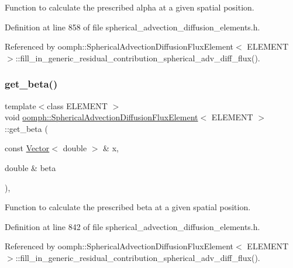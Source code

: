 Function to calculate the prescribed alpha at a given spatial position. 



Definition at line 858 of file spherical\+\_\+advection\+\_\+diffusion\+\_\+elements.\+h.



Referenced by oomph\+::\+Spherical\+Advection\+Diffusion\+Flux\+Element$<$ E\+L\+E\+M\+E\+N\+T $>$\+::fill\+\_\+in\+\_\+generic\+\_\+residual\+\_\+contribution\+\_\+spherical\+\_\+adv\+\_\+diff\+\_\+flux().

\mbox{\label{classoomph_1_1SphericalAdvectionDiffusionFluxElement_a7ba9d40e23873038895ec070b9bc29ad}} 
\subsubsection{\texorpdfstring{get\+\_\+beta()}{get\_beta()}}
{\footnotesize\ttfamily template$<$class E\+L\+E\+M\+E\+NT $>$ \\
void \hyperlink{classoomph_1_1SphericalAdvectionDiffusionFluxElement}{oomph\+::\+Spherical\+Advection\+Diffusion\+Flux\+Element}$<$ E\+L\+E\+M\+E\+NT $>$\+::get\+\_\+beta (\begin{DoxyParamCaption}\item[{const \hyperlink{classoomph_1_1Vector}{Vector}$<$ double $>$ \&}]{x,  }\item[{double \&}]{beta }\end{DoxyParamCaption})\hspace{0.3cm}{\ttfamily [inline]}, {\ttfamily [protected]}}



Function to calculate the prescribed beta at a given spatial position. 



Definition at line 842 of file spherical\+\_\+advection\+\_\+diffusion\+\_\+elements.\+h.



Referenced by oomph\+::\+Spherical\+Advection\+Diffusion\+Flux\+Element$<$ E\+L\+E\+M\+E\+N\+T $>$\+::fill\+\_\+in\+\_\+generic\+\_\+residual\+\_\+contribution\+\_\+spherical\+\_\+adv\+\_\+diff\+\_\+flux().

